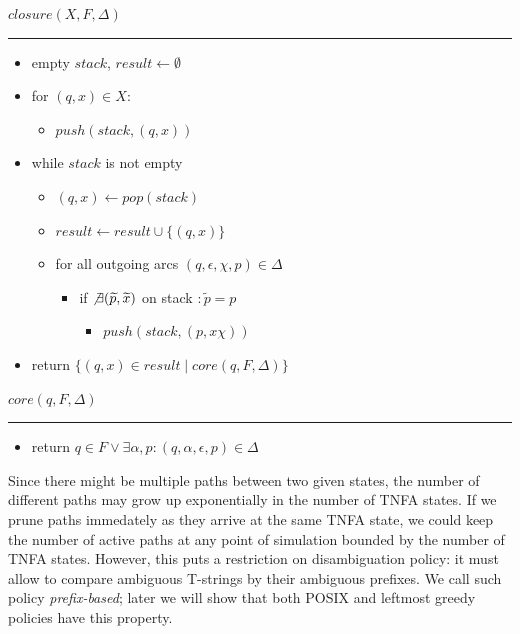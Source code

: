 \documentclass{article}
\newcommand{\Xset}{\!\leftarrow\!}
\newcommand{\Xin}{\!\in\!}
\newcommand{\Xeq}{\!=\!}
\theoremstyle{definition}
\begin{document}
\begin{multicols}{2}
    $closure(X, F, \Delta)$
    \hrule
    \begin{itemize}[leftmargin=0in]
        \smallskip
        \item[] empty $stack$, $result \Xset \emptyset$
        \item[] for $(q, x) \Xin X:$
        \begin{itemize}
            \item[] $push(stack, (q, x))$
        \end{itemize}
        \item[] while $stack$ is not empty
        \begin{itemize}
            \item[] $(q, x) \Xset pop(stack)$
            \item[] $result \Xset result \cup \{(q, x)\}$
            \item[] for all outgoing arcs $(q, \epsilon, \chi, p) \Xin \Delta$
            \begin{itemize}
                \item[] if $\not \exists (\widetilde{p}, \widetilde{x})$ on stack $: \widetilde{p} \Xeq p$
                \begin{itemize}
                    \item[] $push(stack, (p, x \chi))$
                \end{itemize}
            \end{itemize}
        \end{itemize}
        \item[] return $\{ (q, x) \Xin result \mid core(q, F, \Delta) \}$
    \end{itemize}

    \bigskip

    $core(q, F, \Delta)$
    \hrule
    \begin{itemize}[leftmargin=0in]
        \smallskip
        \item[] return $q \Xin F \vee \exists \alpha, p: (q, \alpha, \epsilon, p) \Xin \Delta$
    \end{itemize}

    \bigskip

Since there might be multiple paths between two given states,
the number of different paths may grow up exponentially in the number of TNFA states.
If we prune paths immedately as they arrive at the same TNFA state,
we could keep the number of active paths at any point of simulation bounded by the number of TNFA states.
However, this puts a restriction on disambiguation policy:
it must allow to compare ambiguous T-strings by their ambiguous prefixes.
We call such policy \emph{prefix-based};
later we will show that both POSIX and leftmost greedy policies have this property.


\end{multicols}
\end{document}
